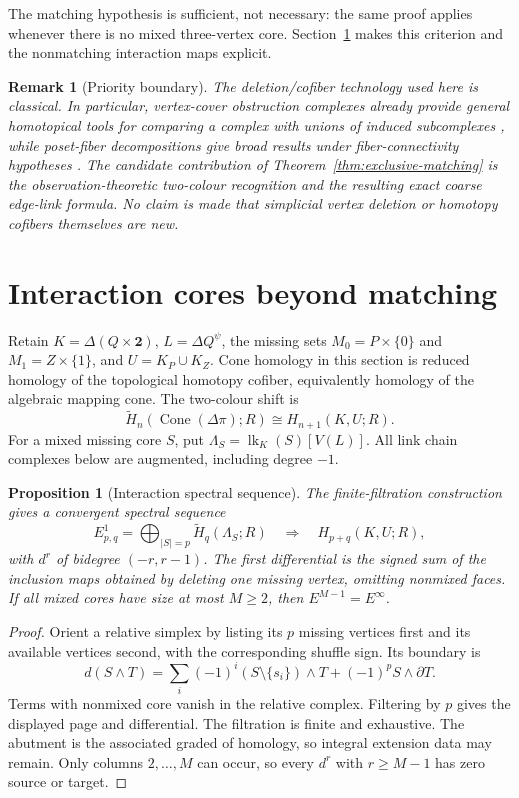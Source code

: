 \documentclass[11pt]{article}
\newtheorem{proposition}[theorem]{Proposition}
\newtheorem{remark}[theorem]{Remark}
\begin{document}
The matching hypothesis is sufficient, not necessary: the same proof applies
whenever there is no mixed three-vertex core.  Section~\ref{sec:interaction-cores}
makes this criterion and the nonmatching interaction maps explicit.

\begin{remark}[Priority boundary]
The deletion/cofiber technology used here is classical.  In particular,
vertex-cover obstruction complexes already provide general homotopical tools
for comparing a complex with unions of induced subcomplexes
\cite{ChacholskiEtAl2021}, while poset-fiber decompositions give broad results
under fiber-connectivity hypotheses \cite{BjornerWachsWelker2005}.  The
candidate contribution of Theorem~\ref{thm:exclusive-matching} is the
observation-theoretic two-colour recognition and the resulting exact coarse
edge-link formula.  No claim is made that simplicial vertex deletion or
homotopy cofibers themselves are new.
\end{remark}


\section{Interaction cores beyond matching}
\label{sec:interaction-cores}

Retain $K=\Delta(Q\times\mathbf 2)$, $L=\Delta Q^\psi$, the missing
sets $M_0=P\times\{0\}$ and $M_1=Z\times\{1\}$, and
$U=K_P\cup K_Z$.  Cone homology in this section is reduced homology
of the topological homotopy cofiber, equivalently homology of the algebraic
mapping cone.  The two-colour shift is
\[
 \widetilde H_n(\operatorname{Cone}(\Delta\pi);R)
 \cong H_{n+1}(K,U;R).
\]
For a mixed missing core $S$, put
$\Lambda_S=\operatorname{lk}_K(S)[V(L)]$.
All link chain complexes below are augmented, including degree $-1$.

\begin{proposition}[Interaction spectral sequence]
\label{prop:interaction-ss}
The finite-filtration construction~\cite{Weibel1994} gives a convergent spectral sequence
\[
 E^1_{p,q}=\bigoplus_{|S|=p}\widetilde H_q(\Lambda_S;R)
 \quad\Longrightarrow\quad H_{p+q}(K,U;R),
\]
with $d^r$ of bidegree $(-r,r-1)$.  The first differential is the
signed sum of the inclusion maps obtained by deleting one missing vertex,
omitting nonmixed faces.  If all mixed cores have size at most $M\ge2$,
then $E^{M-1}=E^\infty$.
\end{proposition}
\begin{proof}
Orient a relative simplex by listing its $p$ missing vertices first and
its available vertices second, with the corresponding shuffle sign.
Its boundary is
\[
 d(S\wedge T)=\sum_i(-1)^i(S\setminus\{s_i\})\wedge T
                 +(-1)^pS\wedge\partial T.
\]
Terms with nonmixed core vanish in the relative complex.  Filtering by
$p$ gives the displayed page and differential.  The filtration is finite and exhaustive.  The abutment is the associated
graded of homology, so integral extension data may remain.
Only columns $2,\ldots,M$ can occur, so every $d^r$ with $r\ge M-1$
has zero source or target.
\end{proof}
\end{document}
